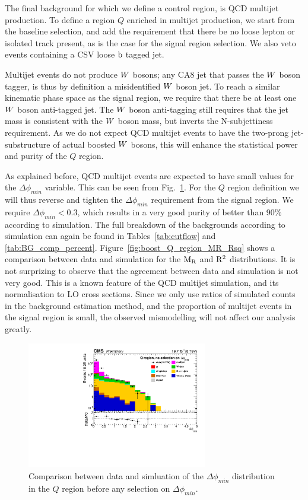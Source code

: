 The final background for which we define a control region, is QCD multijet production.
To define a region $Q$ enriched in multijet production, we start from the baseline selection, and
add the requirement that there be no loose lepton or isolated track present, as is the case for the
signal region selection. We also veto events containing a CSV loose $\mathrm{b}$ tagged jet. 

Multijet events do not produce $W$ bosons; any CA8 jet that passes the $W$ boson tagger,
is thus by definition a misidentified $W$ boson jet. To reach a similar kinematic phase space as
the signal region, we require that there be at least one $W$ boson anti-tagged jet. The $W$ boson
anti-tagging still requires that the jet mass is consistent with the $W$ boson mass, but inverts
the N-subjettiness requirement. As we do not expect QCD multijet events to have the two-prong
jet-substructure of actual boosted $W$ bosons, this will enhance the statistical power and purity
of the $Q$ region. 

As explained before, QCD multijet events are expected to have small values for the
$\Delta\phi_{min}$ variable. This can be seen from Fig.~\ref{fig:boost_Q_region_mindeltaphi}. 
For the $Q$ region definition we will thus reverse
and tighten the $\Delta\phi_{min}$ requirement from the signal region. We require $\Delta\phi_{min}
< 0.3$, which results in a very good purity of better than 90\% according to simulation. 
The full breakdown of the backgrounds according to simulation can again be found in
Tables~\ref{tab:cutflow} and \ref{tab:BG_comp_percent}.
Figure~\ref{fig:boost_Q_region_MR_Rsq} shows a comparison between data and simulation for the $\mathrm{M_R}$
and $\mathrm{R^2}$ distributions. It is not surprizing to observe that the agreement between data and
simulation is not very good. This is a known feature of the QCD multijet simulation, and its
normalisation to LO cross sections. Since we only use ratios of simulated counts in the background
estimation method, and the proportion of multijet events in the signal region is small, the
observed mismodelling will not affect our analysis greatly. 

\begin{figure}[htbp]
\centering
\includegraphics[width=0.7\textwidth]{figures/razor_selection/DataMC_minDeltaPhi_0Lbg1uW0Ll_rebin}
\caption{Comparison between data and simluation of the $\Delta\phi_{min}$ distribution in the $Q$
region before any selection on $\Delta\phi_{min}$. 
\label{fig:boost_Q_region_mindeltaphi}}
\end{figure}

